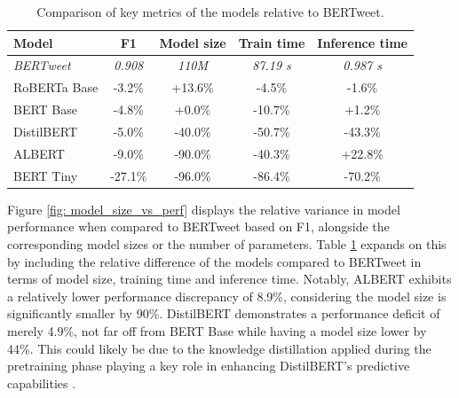 \begin{table}
    \small
    \centering
    \begin{tabularx}{\textwidth}{|X|c|c|c|c|}
        \hline
        \rowcolor[gray]{0.7}
        \textbf{Model} & \textbf{F1} & \textbf{Model size} & \textbf{Train time} & \textbf{Inference time} \\
        \hline
        \textit{BERTweet}       & \textit{0.908}       & \textit{110M}                & \textit{87.19 s}             & \textit{0.987 s}                 \\
        \hline
        RoBERTa Base   & -3.2\%      & +13.6\%             & -4.5\%              & -1.6\%                  \\
        \rowcolor[gray]{0.9}
        BERT Base      & -4.8\%      & +0.0\%              & -10.7\%             & +1.2\%                  \\
        DistilBERT     & -5.0\%      & -40.0\%             & -50.7\%             & -43.3\%                 \\
        \rowcolor[gray]{0.9}
        ALBERT         & -9.0\%      & -90.0\%             & -40.3\%             & +22.8\%                 \\
        BERT Tiny      & -27.1\%     & -96.0\%             & -86.4\%             & -70.2\%                 \\
        \hline
    \end{tabularx}
    \caption{Comparison of key metrics of the models relative to BERTweet.}
    \label{tab: relative_comparison_metrics}
\end{table}

Figure \ref{fig: model_size_vs_perf} displays the relative variance in model performance when compared to BERTweet based on F1, alongside the corresponding model sizes or the number of parameters. Table \ref{tab: relative_comparison_metrics} expands on this by including the relative difference of the models compared to BERTweet in terms of model size, training time and inference time. Notably, ALBERT exhibits a relatively lower performance discrepancy of 8.9\%, considering the model size is significantly smaller by 90\%. DistilBERT demonstrates a performance deficit of merely 4.9\%, not far off from BERT Base while having a model size lower by 44\%. This could likely be due to the knowledge distillation applied during the pretraining phase playing a key role in enhancing DistilBERT's predictive capabilities \cite{sanhDistilBERTDistilledVersion2020}.\\


